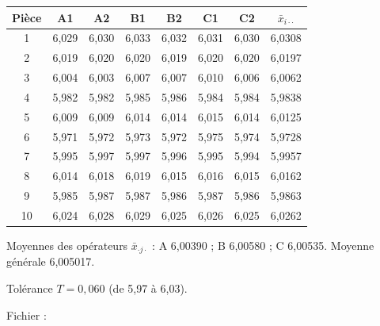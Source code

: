 \documentclass[10pt,a4paper]{article}
\newcommand{\stitre}[1]{\par\vspace{1pt}{\color{uimm}\bfseries\large #1}\par\vspace{-7pt}{\color{cyan}\rule{\linewidth}{0.9pt}}\par\vspace{-3pt}}
\begin{document}
\newpage
{}
\vspace{3pt}
\begin{minipage}[t]{0.535\linewidth}\vspace{0pt}
\stitre{Les données (mm)}
\renewcommand{\arraystretch}{1.0}\setlength{\tabcolsep}{3.5pt}
{\small\begin{tabular}{|c|c|c|c|c|c|c|>{\columncolor{fond}}c|}\hline
\rowcolor{uimm}\color{white}\textbf{Pièce} & \color{white}A1 & \color{white}A2 & \color{white}B1 & \color{white}B2 & \color{white}C1 & \color{white}C2 & \color{white}$\bar x_{i\cdot\cdot}$\\\hline
1 & 6,029 & 6,030 & 6,033 & 6,032 & 6,031 & 6,030 & 6,0308\\
2 & 6,019 & 6,020 & 6,020 & 6,019 & 6,020 & 6,020 & 6,0197\\
3 & 6,004 & 6,003 & 6,007 & 6,007 & 6,010 & 6,006 & 6,0062\\
4 & 5,982 & 5,982 & 5,985 & 5,986 & 5,984 & 5,984 & 5,9838\\
5 & 6,009 & 6,009 & 6,014 & 6,014 & 6,015 & 6,014 & 6,0125\\
6 & 5,971 & 5,972 & 5,973 & 5,972 & 5,975 & 5,974 & 5,9728\\
7 & 5,995 & 5,997 & 5,997 & 5,996 & 5,995 & 5,994 & 5,9957\\
8 & 6,014 & 6,018 & 6,019 & 6,015 & 6,016 & 6,015 & 6,0162\\
9 & 5,985 & 5,987 & 5,987 & 5,986 & 5,987 & 5,986 & 5,9863\\
10 & 6,024 & 6,028 & 6,029 & 6,025 & 6,026 & 6,025 & 6,0262\\\hline
\end{tabular}}
\par\smallskip
{\small Moyennes des opérateurs $\bar x_{\cdot j\cdot}$ : A 6,00390 ; B 6,00580 ; C 6,00535. Moyenne générale 6,005017.\par
Tolérance $T=0{,}060$ (de 5,97 à 6,03).\par
Fichier : }
\end{minipage}\hfill
\end{document}
